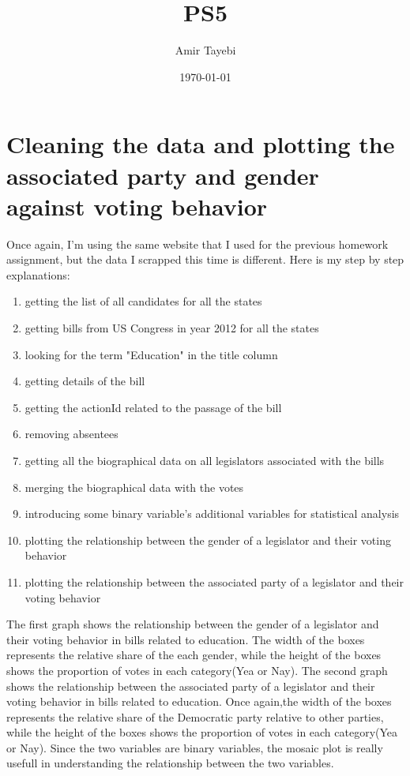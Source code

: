 \documentclass{article}
\title{PS5}
\author{Amir Tayebi}
\date{\today}
\begin{document}
\maketitle

\section{Cleaning the data and plotting the associated party and gender against voting behavior}

Once again, I'm using the same website that I used for the previous homework assignment, but the data I scrapped this time is different. Here is my step by step explanations:
\begin{enumerate}
\item  getting the list of all candidates for all the states
\item getting bills from US Congress in year 2012 for all the states
\item looking for the term  "Education" in the title column
\item getting details of the bill
\item getting the actionId related to the passage of the bill
\item removing absentees
\item getting all the biographical data on all legislators associated with the bills
\item merging the biographical data with the votes
\item introducing some binary variable's additional variables for statistical analysis
\item plotting the relationship between the gender of a legislator and their voting behavior
\item plotting the relationship between the associated party of a legislator and their voting behavior

\end{enumerate}
The first graph shows the relationship between the gender of a legislator and their voting behavior in bills related to education. The width of the boxes represents the relative share of the each gender, while the height of the boxes shows the proportion of votes in each category(Yea or Nay).
The second graph shows the relationship between the associated party of a legislator and their voting behavior in bills related to education. Once again,the width of the boxes represents the relative share of the Democratic party relative to other parties, while the height of the boxes shows the proportion of votes in each category(Yea or Nay).
Since the two variables are binary variables, the mosaic plot is really usefull in understanding the relationship between the two variables.
\end{document}
